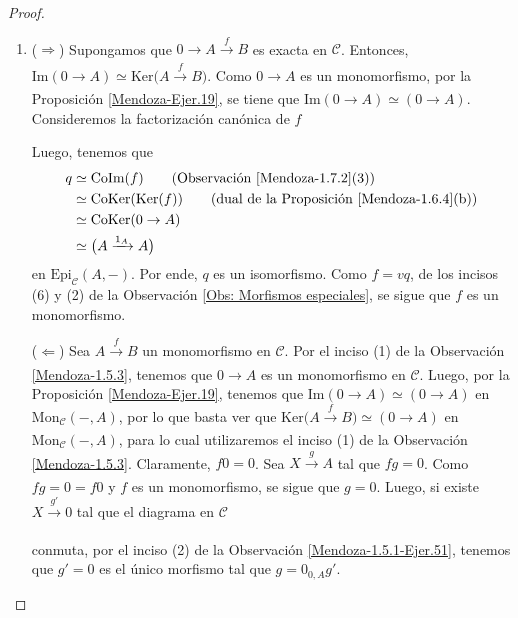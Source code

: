 \documentclass[tesis]{subfiles}
\begin{document}
\begin{proof}
\begin{enumerate}[label=(\alph*)]
        \item ($\Rightarrow$) Supongamos que $0\to A\xrightarrow[]{f} B$ es exacta en $\mathscr{C}$. Entonces, $\text{Im}(0\to A) \simeq \text{Ker}\big( A\xrightarrow[]{f} B\big)$. Como $0\to A$ es un monomorfismo, por la Proposición \ref{Mendoza-Ejer.19}, se tiene que $\text{Im}(0\to A) \simeq (0\to A)$. Consideremos la factorización canónica de $f$
            \begin{center}
            \end{center}
            Luego, tenemos que
            \begin{align*}
                q &\simeq \text{CoIm}(f) \tag{Observación \ref{Mendoza-1.7.2}(3)} \\
                  &\simeq \text{CoKer}(\text{Ker}(f)) \tag{dual de la Proposición \ref{Mendoza-1.6.4}(b)} \\
                  &\simeq \text{CoKer}(0\to A) \\
                  &\simeq \big( A\xrightarrow[]{1_A} A\big)
            \end{align*}
            en $\text{Epi}_\mathscr{C}(A,-)$. Por ende, $q$ es un isomorfismo. Como $f=vq$, de los incisos (6) y (2) de la Observación \ref{Obs: Morfismos especiales}, se sigue que $f$ es un monomorfismo.

            ($\Leftarrow$) Sea $A\xrightarrow[]{f} B$ un monomorfismo en $\mathscr{C}$. Por el inciso (1) de la Observación \ref{Mendoza-1.5.3}, tenemos que $0\to A$ es un monomorfismo en $\mathscr{C}$. Luego, por la Proposición \ref{Mendoza-Ejer.19}, tenemos que $\text{Im}(0\to A)\simeq (0\to A)$ en $\text{Mon}_\mathscr{C}(-,A)$, por lo que basta ver que $\text{Ker}\big(A\xrightarrow[]{f} B\big)\simeq (0\to A)$ en $\text{Mon}_\mathscr{C}(-,A)$, para lo cual utilizaremos el inciso (1) de la Observación \ref{Mendoza-1.5.3}. Claramente, $f0=0$. Sea $X\xrightarrow[]{g} A$ tal que $fg=0$. Como $fg=0=f0$ y $f$ es un monomorfismo, se sigue que $g=0$. Luego, si existe $X\xrightarrow[]{g'} 0$ tal que el diagrama en $\mathscr{C}$
            \begin{center}
            \end{center}
            conmuta, por el inciso (2) de la Observación \ref{Mendoza-1.5.1-Ejer.51}, tenemos que $g'=0$ es el único morfismo tal que $g=0_{0,A}g'$.


\end{enumerate}
\end{proof}
\end{document}
